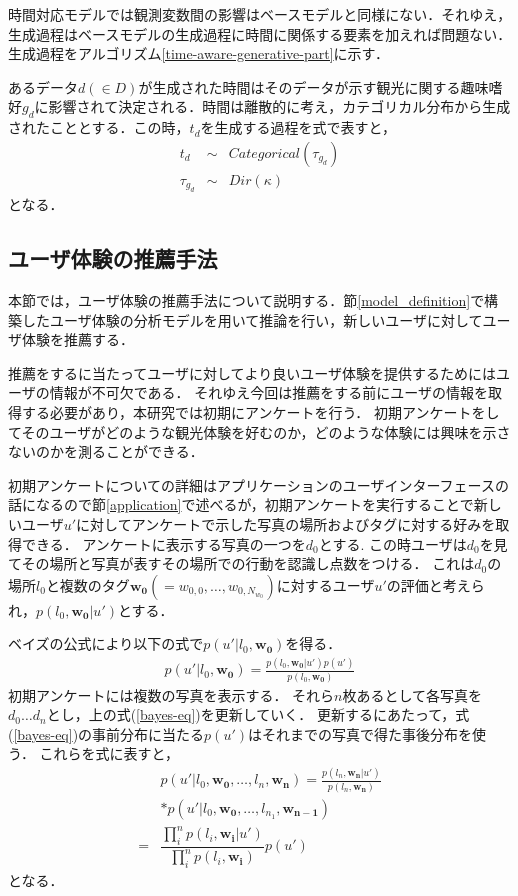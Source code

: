 \documentclass[a4j,10pt, twocolumn]{jarticle}
\begin{document}
%
時間対応モデルでは観測変数間の影響はベースモデルと同様にない．それゆえ，生成過程はベースモデルの生成過程に時間に関係する要素を加えれば問題ない．
生成過程をアルゴリズム\ref{time-aware-generative-part}に示す．

あるデータ$d(\in D)$が生成された時間はそのデータが示す観光に関する趣味嗜好$g_d$に影響されて決定される．時間は離散的に考え，カテゴリカル分布から生成されたこととする．この時，$t_d$を生成する過程を式で表すと，
\begin{eqnarray}
  t_d & \sim & Categorical(\tau_{g_d}) \\
  \tau_{g_d} & \sim & Dir(\kappa)
\end{eqnarray}
となる．

\subsection{ユーザ体験の推薦手法} \label{recommendation}
本節では，ユーザ体験の推薦手法について説明する．節\ref{model_definition}で構築したユーザ体験の分析モデルを用いて推論を行い，新しいユーザに対してユーザ体験を推薦する．

推薦をするに当たってユーザに対してより良いユーザ体験を提供するためにはユーザの情報が不可欠である．
それゆえ今回は推薦をする前にユーザの情報を取得する必要があり，本研究では初期にアンケートを行う．
初期アンケートをしてそのユーザがどのような観光体験を好むのか，どのような体験には興味を示さないのかを測ることができる．

初期アンケートについての詳細はアプリケーションのユーザインターフェースの話になるので節\ref{application}で述べるが，初期アンケートを実行することで新しいユーザ$u'$に対してアンケートで示した写真の場所およびタグに対する好みを取得できる．
アンケートに表示する写真の一つを$d_0$とする.
この時ユーザは$d_0$を見てその場所と写真が表すその場所での行動を認識し点数をつける．
これは$d_0$の場所$l_0$と複数のタグ$\bm{w_0}(=w_{0,0}, \dots, w_{0,N_{w_0}})$に対するユーザ$u'$の評価と考えられ，$p(l_0,\bm{w_0}|u')$とする．

ベイズの公式により以下の式で$p(u'|l_0, \bm{w_0})$を得る．
\begin{eqnarray}
  \label{bayes-eq}
  p(u'|l_0, \bm{w_0}) = \frac{p(l_0, \bm{w_0}|u')p(u')}{p(l_0, \bm{w_0})}
\end{eqnarray}
初期アンケートには複数の写真を表示する．
それら$n$枚あるとして各写真を$d_0 \dots d_n$とし，上の式(\ref{bayes-eq})を更新していく．
更新するにあたって，式(\ref{bayes-eq})の事前分布に当たる$p(u')$はそれまでの写真で得た事後分布を使う．
これらを式に表すと，
\begin{align}
  &p(u'|l_0, \bm{w_0}, \dots , l_n, \bm{w_n}) = \frac{p(l_n, \bm{w_n}|u')}{p(l_n, \bm{w_n})} \nonumber \\
  &* p(u'|l_0, \bm{w_0}, \dots , l_{n_1}, \bm{w_{n-1}}) \\
  \label{bayes-update}
  =& \dfrac{\prod_i^n p(l_i, \bm{w_i}|u')}{\prod_i^n p(l_i, \bm{w_i})} p(u') 
\end{align}
となる．
\end{document}
